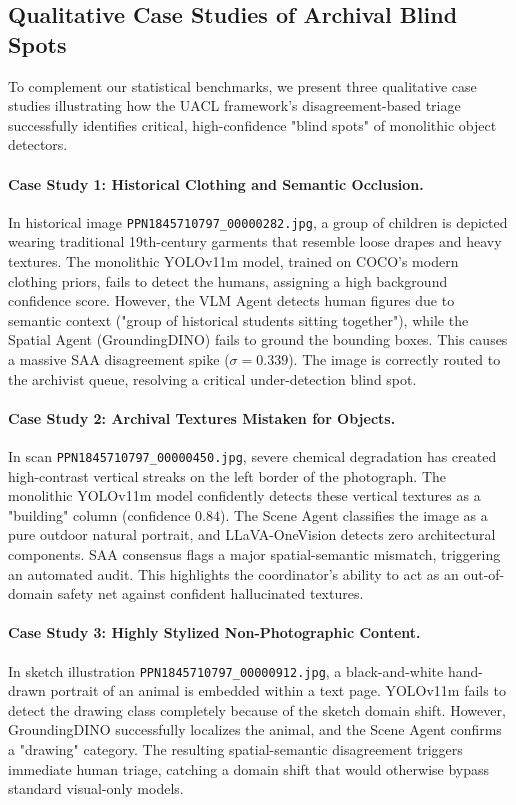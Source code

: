 \documentclass[12pt,onecolumn,a4paper]{IEEEtran}
\begin{document}
\subsection{Qualitative Case Studies of Archival Blind Spots}
To complement our statistical benchmarks, we present three qualitative case studies illustrating how the UACL framework's disagreement-based triage successfully identifies critical, high-confidence "blind spots" of monolithic object detectors.

\paragraph{Case Study 1: Historical Clothing and Semantic Occlusion.}
In historical image \texttt{PPN1845710797\_00000282.jpg}, a group of children is depicted wearing traditional 19th-century garments that resemble loose drapes and heavy textures. The monolithic YOLOv11m model, trained on COCO's modern clothing priors, fails to detect the humans, assigning a high background confidence score. However, the VLM Agent detects human figures due to semantic context ("group of historical students sitting together"), while the Spatial Agent (GroundingDINO) fails to ground the bounding boxes. This causes a massive SAA disagreement spike ($\sigma = 0.339$). The image is correctly routed to the archivist queue, resolving a critical under-detection blind spot.

\paragraph{Case Study 2: Archival Textures Mistaken for Objects.}
In scan \texttt{PPN1845710797\_00000450.jpg}, severe chemical degradation has created high-contrast vertical streaks on the left border of the photograph. The monolithic YOLOv11m model confidently detects these vertical textures as a "building" column (confidence $0.84$). The Scene Agent classifies the image as a pure outdoor natural portrait, and LLaVA-OneVision detects zero architectural components. SAA consensus flags a major spatial-semantic mismatch, triggering an automated audit. This highlights the coordinator's ability to act as an out-of-domain safety net against confident hallucinated textures.

\paragraph{Case Study 3: Highly Stylized Non-Photographic Content.}
In sketch illustration \texttt{PPN1845710797\_00000912.jpg}, a black-and-white hand-drawn portrait of an animal is embedded within a text page. YOLOv11m fails to detect the drawing class completely because of the sketch domain shift. However, GroundingDINO successfully localizes the animal, and the Scene Agent confirms a "drawing" category. The resulting spatial-semantic disagreement triggers immediate human triage, catching a domain shift that would otherwise bypass standard visual-only models.
\end{document}
